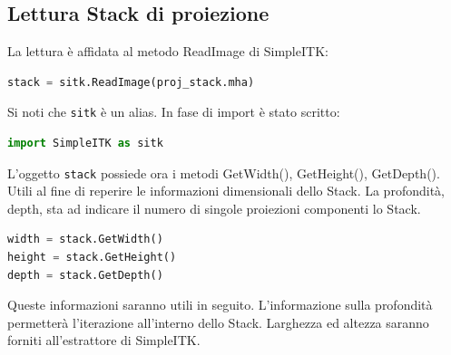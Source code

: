 \documentclass[a4paper,12pt, doubleside]{report}
\begin{document}
            \subsection{Lettura Stack di proiezione}
                \par
                    La lettura è affidata al metodo ReadImage\cite{sitk-readimage} di SimpleITK:
                    
                    \begin{lstlisting}[language=python, frame=bt]
stack = sitk.ReadImage(proj_stack.mha)
                    \end{lstlisting}
                    
                    Si noti che \texttt{sitk} è un alias. In fase di import è stato scritto:
                    \begin{lstlisting}[language=python, frame=bt]
import SimpleITK as sitk
                    \end{lstlisting}
                    
                    L'oggetto \texttt{stack} possiede ora i metodi GetWidth(), GetHeight(), GetDepth(). Utili al fine di reperire le informazioni dimensionali dello Stack. La profondità, depth, sta ad indicare il numero di singole proiezioni componenti lo Stack.
                    
                    \begin{lstlisting}[language=python, frame=bt]
width = stack.GetWidth()
height = stack.GetHeight()
depth = stack.GetDepth()
                    \end{lstlisting} 
             
                    Queste informazioni saranno utili in seguito. L'informazione sulla profondità permetterà l'iterazione all'interno dello Stack. Larghezza ed altezza saranno forniti all'estrattore di SimpleITK.
                    
\end{document}
